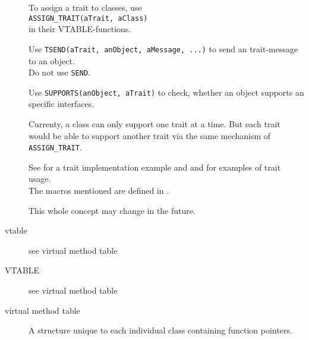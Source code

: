 \begin{description}
To assign a trait to classes, use\\
\lstinline|ASSIGN_TRAIT(aTrait, aClass)| \\
in their VTABLE-functions.


Use \lstinline|TSEND(aTrait, anObject, aMessage, ...)| to send an
trait-message to an object. \\
Do not use \lstinline|SEND|.

Use \lstinline|SUPPORTS(anObject, aTrait)| to check, whether an object
supports an specific interfaces.

Currenty, a class can only support one trait at a time. But each
trait would be able to support another trait via the same mechanism of
\lstinline|ASSIGN_TRAIT|.

See  for a trait implementation example and
 and  for examples of
trait usage. \\
The macros mentioned are defined in .

This whole concept may change in the future.
\item[vtable] see virtual method table
\item[VTABLE] see virtual method table
\item[virtual method table] A structure unique to each individual
  class containing \C function pointers.
\end{description}
